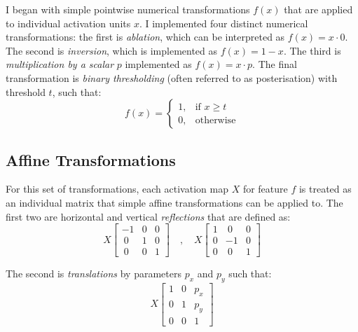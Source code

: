 I began with simple pointwise numerical transformations $f(x)$ that are applied to individual activation units $x$. 
I implemented four distinct numerical transformations: the first is \emph{ablation}, which can be interpreted as $f(x) = x \cdot 0$. 
The second is \emph{inversion}, which is implemented as $f(x) = 1 - x$. 
The third is \emph{multiplication by a scalar} $p$ implemented as $f(x) = x \cdot p$. 
The final transformation is \emph{binary thresholding} (often referred to  as posterisation) with threshold $t$, such that:
\begin{equation}
f(x) = \begin{cases}
    1,& \text{if  } x\geq t\\
    0,              & \text{otherwise}
\end{cases}
\end{equation}

\subsection{Affine Transformations}
\label{sec:affine}
For this set of transformations, each activation map $X$ for feature $f$ is treated as an individual matrix that simple affine transformations can be applied to. 
The first two are horizontal and vertical \emph{reflections} that are defined as:
\begin{equation}
X \begin{bmatrix}
-1 & 0 & 0\\
\ 0 & 1 & 0\\
\ 0 & 0 & 1
\end{bmatrix}\quad , \quad X \begin{bmatrix}
1 & \ 0 & 0\\
0 & -1 & 0\\
0 & \ 0 & 1
\end{bmatrix}
\end{equation}

\noindent The second is \emph{translations} by parameters $p_x$ and $p_y$ such that:
\begin{equation}
X \begin{bmatrix}
1 & 0 & p_x\\
0 & 1 & p_y\\
0 & 0 & 1
\end{bmatrix}
\end{equation}


